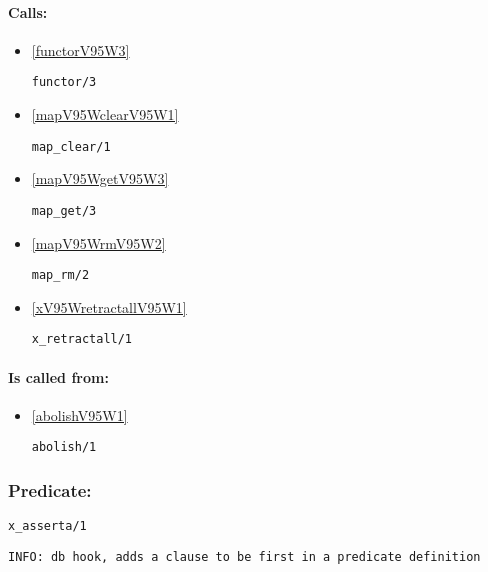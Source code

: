 \paragraph{Calls:} 
\begin{itemize}
\item \ref{functorV95W3} 
\begin{verbatim}
functor/3
\end{verbatim}

\item \ref{mapV95WclearV95W1} 
\begin{verbatim}
map_clear/1
\end{verbatim}

\item \ref{mapV95WgetV95W3} 
\begin{verbatim}
map_get/3
\end{verbatim}

\item \ref{mapV95WrmV95W2} 
\begin{verbatim}
map_rm/2
\end{verbatim}

\item \ref{xV95WretractallV95W1} 
\begin{verbatim}
x_retractall/1
\end{verbatim}

\end{itemize}
\paragraph{Is called from:} 
\begin{itemize}
\item \ref{abolishV95W1} 
\begin{verbatim}
abolish/1
\end{verbatim}

\end{itemize}

\subsubsection{Predicate:} \label{xV95WassertaV95W1}

\begin{verbatim}
x_asserta/1
\end{verbatim}

{\small \begin{verbatim}
INFO: db hook, adds a clause to be first in a predicate definition

\end{verbatim}}
